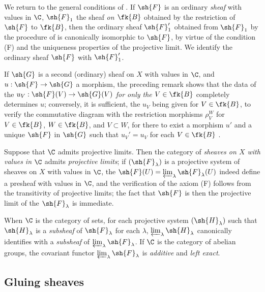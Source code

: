 \begin{env}[3.2.5]
\label{0.3.2.5}
We return to the general conditions of . If $\sh{F}$ is an
ordinary \emph{sheaf} with values in $\C$, $\sh{F}_1$ the sheaf \emph{on
$\fk{B}$} obtained by the restriction of $\sh{F}$ to $\fk{B}$, then
the ordinary sheaf $\sh{F}_1'$ obtained from $\sh{F}_1$ by the procedure of
 is canonically isomorphic to $\sh{F}$, by virtue of the
condition (F) and the uniqueness properties of the projective limit. We identify
the ordinary sheaf $\sh{F}$ with $\sh{F}_1'$.

If $\sh{G}$ is a second (ordinary) sheaf on $X$ with values in $\C$, and
$u:\sh{F}\to\sh{G}$ a morphism, the preceding remark shows that the data of the
$u_V:\sh{F}(V)\to\sh{G}(V)$ \emph{for only the $V\in\fk{B}$} completely
determines $u$; conversely, it is sufficient, the $u_V$ being given for
$V\in\fk{B}$, to verify the commutative diagram with the restriction
morphisms $\rho_V^W$ for $V\in\fk{B}$, $W\in\fk{B}$, and
$V\subset W$, for there to exist a morphism $u'$ and a unique $\sh{F}$ in
$\sh{G}$ such that $u_V'=u_V$ for each $V\in\fk{B}$ .
\end{env}

\begin{env}[3.2.6]
\label{0.3.2.6}
Suppose that $\C$ admits projective limits. Then the category of \emph{sheaves
on $X$ with values in $\C$} admits \emph{projective limits}; if
$(\sh{F}_\lambda)$ is a projective system of sheaves on $X$ with values in $\C$,
the $\sh{F}(U)=\varprojlim_\lambda\sh{F}_\lambda(U)$ indeed define a presheaf
with values in $\C$, and the verification of the axiom (F) follows from the
transitivity of projective limits; the fact that $\sh{F}$ is then the projective
limit of the $\sh{F}_\lambda$ is immediate.

When $\C$ is the category of sets, for each projective system
$(\sh{H}_\lambda)$ such
that $\sh{H}_\lambda$ is a \emph{subsheaf} of $\sh{F}_\lambda$ for each
$\lambda$, $\varprojlim_\lambda\sh{H}_\lambda$ canonically identifies with
a \emph{subsheaf} of $\varprojlim_\lambda\sh{F}_\lambda$. If $\C$ is the
category of abelian groups, the covariant functor
$\varprojlim_\lambda\sh{F}_\lambda$ is \emph{additive} and \emph{left exact}.
\end{env}

\subsection{Gluing sheaves}
\label{subsection:gluing-sheaves}

